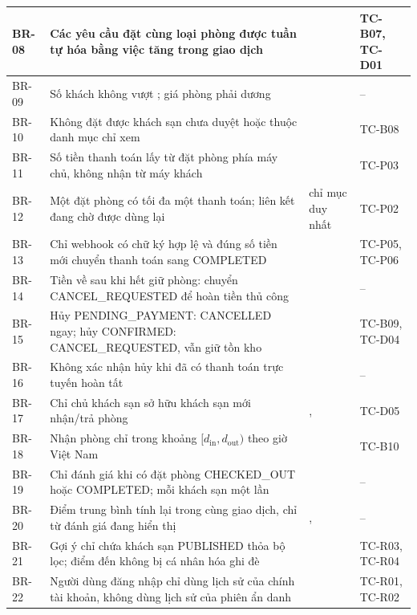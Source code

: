 \begin{rtable}
\begin{longtable}{|C{1.2cm}|L{7.0cm}|L{3.7cm}|L{2.9cm}|}
BR-08 & Các yêu cầu đặt cùng loại phòng được tuần tự hóa bằng việc tăng  trong giao dịch &  & TC-B07, TC-D01 \\ \hline
BR-09 & Số khách không vượt ; giá phòng phải dương &  & -- \\ \hline
BR-10 & Không đặt được khách sạn chưa duyệt hoặc thuộc danh mục chỉ xem &  & TC-B08 \\ \hline
BR-11 & Số tiền thanh toán lấy từ đặt phòng phía máy chủ, không nhận từ máy khách &  & TC-P03 \\ \hline
BR-12 & Một đặt phòng có tối đa một thanh toán; liên kết đang chờ được dùng lại & chỉ mục duy nhất  & TC-P02 \\ \hline
BR-13 & Chỉ webhook có chữ ký hợp lệ và đúng số tiền mới chuyển thanh toán sang COMPLETED &  & TC-P05, TC-P06 \\ \hline
BR-14 & Tiền về sau khi hết giữ phòng: chuyển CANCEL\_REQUESTED để hoàn tiền thủ công &  & -- \\ \hline
BR-15 & Hủy PENDING\_PAYMENT: CANCELLED ngay; hủy CONFIRMED: CANCEL\_REQUESTED, vẫn giữ tồn kho &  & TC-B09, TC-D04 \\ \hline
BR-16 & Không xác nhận hủy khi đã có thanh toán trực tuyến hoàn tất &  & -- \\ \hline
BR-17 & Chỉ chủ khách sạn sở hữu khách sạn mới nhận/trả phòng & ,  & TC-D05 \\ \hline
BR-18 & Nhận phòng chỉ trong khoảng $[d_{\text{in}}, d_{\text{out}})$ theo giờ Việt Nam &  & TC-B10 \\ \hline
BR-19 & Chỉ đánh giá khi có đặt phòng CHECKED\_OUT hoặc COMPLETED; mỗi khách sạn một lần &  & -- \\ \hline
BR-20 & Điểm trung bình tính lại trong cùng giao dịch, chỉ từ đánh giá đang hiển thị & ,  & -- \\ \hline
BR-21 & Gợi ý chỉ chứa khách sạn PUBLISHED thỏa bộ lọc; điểm đến không bị cá nhân hóa ghi đè &  & TC-R03, TC-R04 \\ \hline
BR-22 & Người dùng đăng nhập chỉ dùng lịch sử của chính tài khoản, không dùng lịch sử của phiên ẩn danh &  & TC-R01, TC-R02 \\ \hline

\end{longtable}
\end{rtable}
